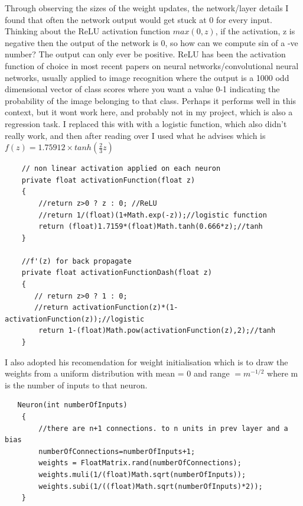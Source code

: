 \documentclass[11pt]{article} %
\begin{document}
Through observing the sizes of the weight updates, the network/layer details I found that often the network output would get stuck at 0 for every input. Thinking about the ReLU activation function $max(0,z)$, if the activation, z is negative then the output of the network is 0, so how can we compute sin of a -ve number? The output can only ever be positive. ReLU has been the activation function of choice in most recent papers on neural networks/convolutional neural networks, usually applied to image recognition where the output is a 1000 odd dimensional vector of class scores where you want a value 0-1 indicating the probability of the image belonging to that class. Perhaps it performs well in this context, but it wont work here, and probably not in my project, which is also a regression task. 
I replaced this with with a logistic function, which also didn't really work, and then after reading over \cite{LeCun2012} I used what he advises which is $f(z) = 1.75912 \times tanh(\frac{2}{3} z)$

\begin{lstlisting}
    // non linear activation applied on each neuron
    private float activationFunction(float z)
    {
        //return z>0 ? z : 0; //ReLU
        //return 1/(float)(1+Math.exp(-z));//logistic function
        return (float)1.7159*(float)Math.tanh(0.666*z);//tanh
    }
    
    //f'(z) for back propagate
    private float activationFunctionDash(float z)
    {
       // return z>0 ? 1 : 0;
       //return activationFunction(z)*(1-activationFunction(z));//logistic
        return 1-(float)Math.pow(activationFunction(z),2);//tanh
    }
\end{lstlisting}

I also adopted his recomendation for weight initialisation which is to draw the weights from a uniform distribution with mean = 0 and range $= m^{-1/2}$ where m is the number of inputs to that neuron. 
\begin{lstlisting}
   Neuron(int numberOfInputs)
    {
        //there are n+1 connections. to n units in prev layer and a bias
        numberOfConnections=numberOfInputs+1;
        weights = FloatMatrix.rand(numberOfConnections);
        weights.muli(1/(float)Math.sqrt(numberOfInputs));
        weights.subi(1/((float)Math.sqrt(numberOfInputs)*2));
    }
\end{lstlisting}
\end{document}
